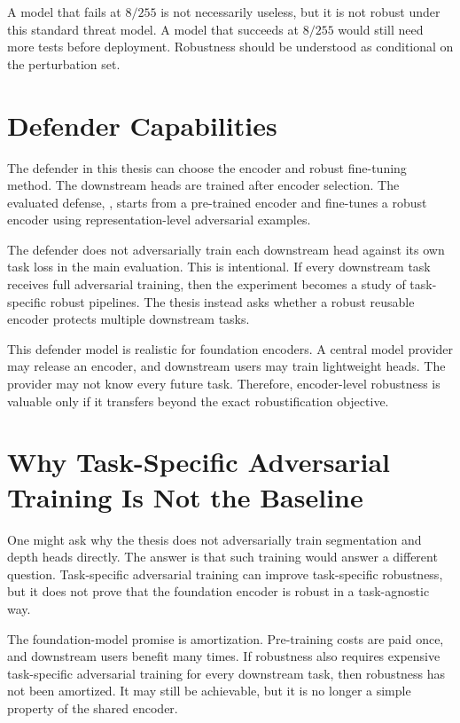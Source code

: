 A model that fails at $8/255$ is not necessarily useless, but it is not robust under this standard threat model. A model that succeeds at $8/255$ would still need more tests before deployment. Robustness should be understood as conditional on the perturbation set.

\section{Defender Capabilities}

The defender in this thesis can choose the encoder and robust fine-tuning method. The downstream heads are trained after encoder selection. The evaluated defense, \DeACL, starts from a pre-trained encoder and fine-tunes a robust encoder using representation-level adversarial examples.

The defender does not adversarially train each downstream head against its own task loss in the main evaluation. This is intentional. If every downstream task receives full adversarial training, then the experiment becomes a study of task-specific robust pipelines. The thesis instead asks whether a robust reusable encoder protects multiple downstream tasks.

This defender model is realistic for foundation encoders. A central model provider may release an encoder, and downstream users may train lightweight heads. The provider may not know every future task. Therefore, encoder-level robustness is valuable only if it transfers beyond the exact robustification objective.

\section{Why Task-Specific Adversarial Training Is Not the Baseline}

One might ask why the thesis does not adversarially train segmentation and depth heads directly. The answer is that such training would answer a different question. Task-specific adversarial training can improve task-specific robustness, but it does not prove that the foundation encoder is robust in a task-agnostic way.

The foundation-model promise is amortization. Pre-training costs are paid once, and downstream users benefit many times. If robustness also requires expensive task-specific adversarial training for every downstream task, then robustness has not been amortized. It may still be achievable, but it is no longer a simple property of the shared encoder.

